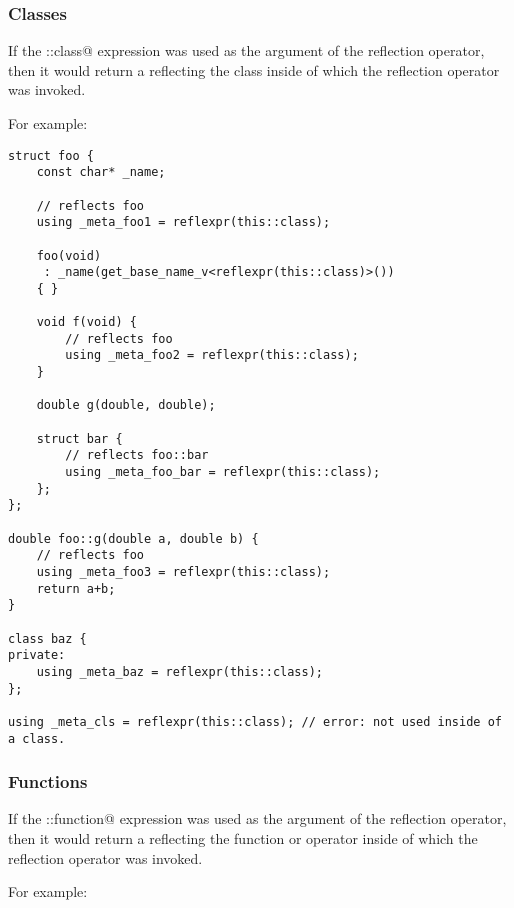 \subsubsection{Classes}

If the \verb@this::class@ expression was used as the argument of the reflection
operator, then it would return a  reflecting the class
inside of which the reflection operator was invoked.

For example:

\begin{verbatim}
struct foo {
	const char* _name;

	// reflects foo
	using _meta_foo1 = reflexpr(this::class);

	foo(void)
	 : _name(get_base_name_v<reflexpr(this::class)>())
	{ }

	void f(void) {
		// reflects foo
		using _meta_foo2 = reflexpr(this::class);
	}

	double g(double, double);

	struct bar {
		// reflects foo::bar
		using _meta_foo_bar = reflexpr(this::class);
	};
};

double foo::g(double a, double b) {
	// reflects foo
	using _meta_foo3 = reflexpr(this::class);
	return a+b;
}

class baz {
private:
	using _meta_baz = reflexpr(this::class);
};

using _meta_cls = reflexpr(this::class); // error: not used inside of a class.

\end{verbatim}

\subsubsection{Functions}

If the \verb@this::function@ expression was used as the argument of the reflection
operator, then it would return a  reflecting the function or operator
inside of which the reflection operator was invoked.

For example:


